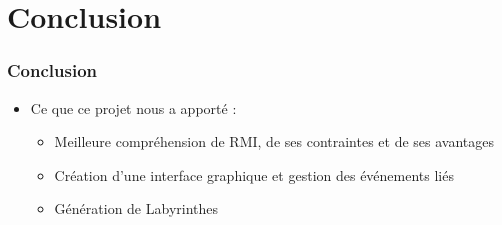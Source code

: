 \section{Conclusion}

  \begin{frame}
    \frametitle{Conclusion}
    	\begin{itemize}
    		\item Ce que ce projet nous a apporté :
    		\begin{itemize}
    			\item Meilleure compréhension de RMI, de ses contraintes et de ses avantages
    			\item Création d'une interface graphique et gestion des événements liés
    			\item Génération de Labyrinthes
    		\end{itemize}
    	\end{itemize}
  \end{frame}

